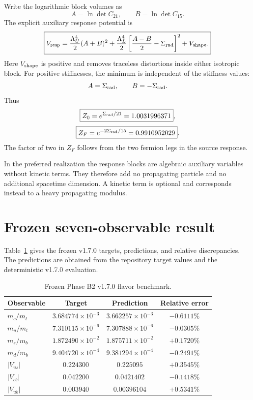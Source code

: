 \documentclass[11pt]{article}
\begin{document}
Write the logarithmic block volumes as
\begin{equation}
A=\ln\det C_{21},\qquad B=\ln\det C_{15}.
\end{equation}
The explicit auxiliary response potential is
\begin{equation}
\boxed{
V_{\rm resp}
=\frac{\Lambda_U^4}{2}(A+B)^2
+\frac{\Lambda_L^4}{2}
\left[\frac{A-B}{2}-\Sigma_{\rm rad}\right]^2
+V_{\rm shape}.}
\end{equation}
Here $V_{\rm shape}$ is positive and removes traceless distortions inside either isotropic block. For positive stiffnesses, the minimum is independent of the stiffness values:
\begin{equation}
A=\Sigma_{\rm rad},\qquad B=-\Sigma_{\rm rad}.
\end{equation}
Thus
\begin{equation}
\boxed{Z_0=e^{\Sigma_{\rm rad}/21}=1.0031996371},
\end{equation}
\begin{equation}
\boxed{Z_F=e^{-2\Sigma_{\rm rad}/15}=0.9910952029}.
\end{equation}
The factor of two in $Z_F$ follows from the two fermion legs in the source response.

In the preferred realization the response blocks are algebraic auxiliary variables without kinetic terms. They therefore add no propagating particle and no additional spacetime dimension. A kinetic term is optional and corresponds instead to a heavy propagating modulus.

\section{Frozen seven-observable result}

Table~\ref{tab:flavor} gives the frozen v1.7.0 targets, predictions, and relative discrepancies. The predictions are obtained from the repository target values and the deterministic v1.7.0 evaluation.

\begin{table}[ht]
\centering
\caption{Frozen Phase B2 v1.7.0 flavor benchmark.}
\label{tab:flavor}
\begin{tabular}{lccc}
\toprule
Observable & Target & Prediction & Relative error \\
\midrule
$m_c/m_t$ & $3.684774\times10^{-3}$ & $3.662257\times10^{-3}$ & $-0.6111\%$ \\
$m_u/m_t$ & $7.310115\times10^{-6}$ & $7.307888\times10^{-6}$ & $-0.0305\%$ \\
$m_s/m_b$ & $1.872490\times10^{-2}$ & $1.875711\times10^{-2}$ & $+0.1720\%$ \\
$m_d/m_b$ & $9.404720\times10^{-4}$ & $9.381294\times10^{-4}$ & $-0.2491\%$ \\
$|V_{us}|$ & $0.224300$ & $0.225095$ & $+0.3545\%$ \\
$|V_{cb}|$ & $0.042200$ & $0.0421402$ & $-0.1418\%$ \\
$|V_{ub}|$ & $0.003940$ & $0.00396104$ & $+0.5341\%$ \\
\bottomrule
\end{tabular}
\end{table}
\end{document}

